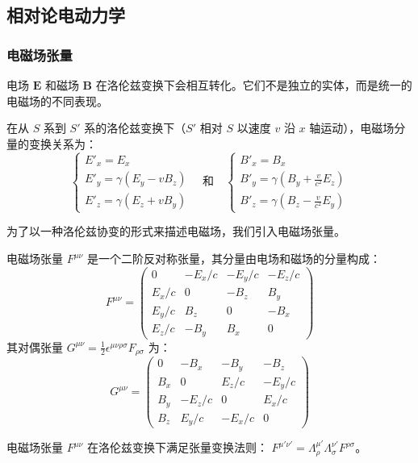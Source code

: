 \documentclass[fontset=none]{ctexart}
\begin{document}
\subsection{相对论电动力学}
\subsubsection{电磁场张量}
电场 $\bm{E}$ 和磁场 $\bm{B}$ 在洛伦兹变换下会相互转化。它们不是独立的实体，而是统一的电磁场的不同表现。
\begin{theorem}[场变换]
在从 $S$ 系到 $S'$ 系的洛伦兹变换下（$S'$ 相对 $S$ 以速度 $v$ 沿 $x$ 轴运动），电磁场分量的变换关系为：
\begin{equation}
\begin{cases} 
E'_x = E_x \\
E'_y = \gamma(E_y - vB_z) \\
E'_z = \gamma(E_z + vB_y)
\end{cases}
\quad \text{和} \quad
\begin{cases} 
B'_x = B_x \\
B'_y = \gamma(B_y + \frac{v}{c^2}E_z) \\
B'_z = \gamma(B_z - \frac{v}{c^2}E_y)
\end{cases}
\end{equation}
\end{theorem}
为了以一种洛伦兹协变的形式来描述电磁场，我们引入电磁场张量。
\begin{definition}[电磁场张量]
电磁场张量 $F^{\mu\nu}$ 是一个二阶反对称张量，其分量由电场和磁场的分量构成：
\begin{equation}
F^{\mu\nu} = 
\begin{pmatrix}
0 & -E_x/c & -E_y/c & -E_z/c \\
E_x/c & 0 & -B_z & B_y \\
E_y/c & B_z & 0 & -B_x \\
E_z/c & -B_y & B_x & 0
\end{pmatrix}
\end{equation}
其对偶张量 $G^{\mu\nu} = \frac{1}{2}\epsilon^{\mu\nu\rho\sigma}F_{\rho\sigma}$ 为：
\begin{equation}
G^{\mu\nu} = 
\begin{pmatrix}
0 & -B_x & -B_y & -B_z \\
B_x & 0 & E_z/c & -E_y/c \\
B_y & -E_z/c & 0 & E_x/c \\
B_z & E_y/c & -E_x/c & 0
\end{pmatrix}
\end{equation}
\end{definition}
电磁场张量 $F^{\mu\nu}$ 在洛伦兹变换下满足张量变换法则： $F^{\mu'\nu'} = \Lambda^{\mu'}_{\rho}\Lambda^{\nu'}_{\sigma}F^{\rho\sigma}$。
\end{document}

